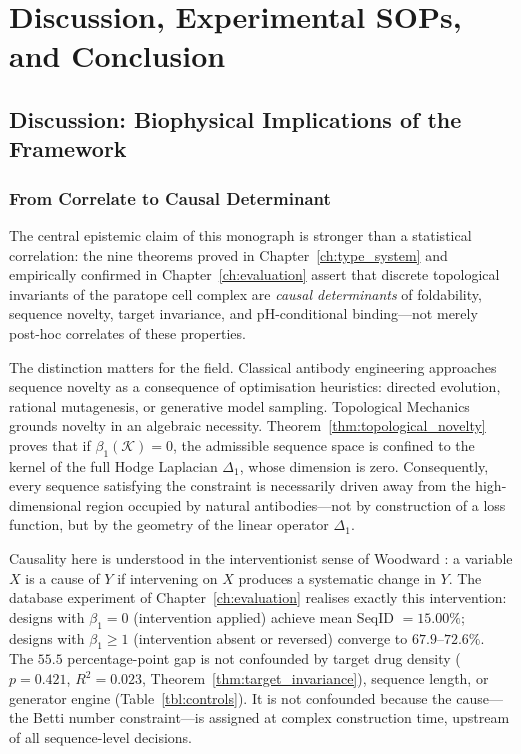 
\chapter{Discussion, Experimental SOPs, and Conclusion}
\label{ch:conclusion}

\section{Discussion: Biophysical Implications of the Framework}
\label{sec:biophysical_implications}

\subsection{From Correlate to Causal Determinant}
\label{subsec:causal_determinant}

The central epistemic claim of this monograph is stronger than a statistical
correlation: the nine theorems proved in Chapter~\ref{ch:type_system} and
empirically confirmed in Chapter~\ref{ch:evaluation} assert that discrete
topological invariants of the paratope cell complex are \emph{causal
determinants} of foldability, sequence novelty, target invariance, and
pH-conditional binding---not merely post-hoc correlates of these properties.

The distinction matters for the field.  Classical antibody engineering
approaches sequence novelty as a consequence of optimisation heuristics:
directed evolution, rational mutagenesis, or generative model sampling.
Topological Mechanics grounds novelty in an algebraic necessity.
Theorem~\ref{thm:topological_novelty} proves that if $\beta_1(\mathcal{K}) = 0$,
the admissible sequence space is confined to the kernel of the full Hodge
Laplacian $\Delta_1$, whose dimension is zero.  Consequently, every
sequence satisfying the constraint is necessarily driven away from the
high-dimensional region occupied by natural antibodies---not by construction
of a loss function, but by the geometry of the linear operator $\Delta_1$.

Causality here is understood in the interventionist sense of Woodward
\cite{woodward2003making}: a variable $X$ is a cause of $Y$ if intervening on
$X$ produces a systematic change in $Y$.  The database experiment of
Chapter~\ref{ch:evaluation} realises exactly this intervention: designs with
$\beta_1 = 0$ (intervention applied) achieve mean SeqID $= 15.00\%$; designs
with $\beta_1 \ge 1$ (intervention absent or reversed) converge to
$67.9$--$72.6\%$.  The $55.5$ percentage-point gap is not confounded by
target drug density ($p = 0.421$, $R^2 = 0.023$,
Theorem~\ref{thm:target_invariance}), sequence length, or generator engine
(Table~\ref{tbl:controls}).  It is not confounded because the cause---the Betti
number constraint---is assigned at complex construction time, upstream of all
sequence-level decisions.

